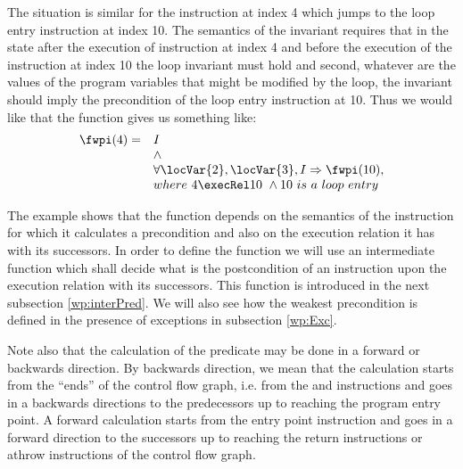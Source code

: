 The situation is  similar  for the instruction at index 4 which jumps to the loop entry instruction at index 10. 
The semantics of the invariant requires that  in the state after the execution of instruction at index 4 and before the execution 
of the instruction at index 10 the loop invariant must hold
and second,  whatever are the values
of the program variables that might be modified by the loop, the invariant should imply the precondition of the loop entry instruction at 10.
 Thus we would like that  the function \fwpi{} gives us something like: 
   $$\begin{array}{ll} \fwpi( 4 ) =& 
                    I \\
		    &\wedge \\
		    &\forall \locVar{2}, \locVar{3},  I  \Rightarrow \fwpi(10), \\
			&    where \ 4 \execRel 10 \ \wedge 10 \ is \ a \ loop \ entry   
      \end{array}
                 $$

The example shows that the function \fwpi{} depends  on the semantics of the instruction 
for which it calculates a precondition and also on the execution relation it has with its successors.
In order to define the function \fwpi{} we will use an intermediate function which shall decide 
what is the postcondition of an instruction  upon the execution relation with its successors. This function 
is introduced in the next subsection \ref{wp:interPred}. We will also see how the weakest precondition is defined in the presence of exceptions in subsection \ref{wp:Exc}.

Note also that the calculation of the \wpName{} predicate may be done in a forward or backwards direction. By backwards direction, we mean that the calculation starts from 
the ``ends'' of the control flow graph, i.e. from the \return{}  and \athrow{}  instructions and goes in a backwards directions to the predecessors up to reaching the program 
entry point. A forward calculation starts from the entry point instruction and goes in a forward direction to the successors up to reaching the return instructions or athrow instructions 
of the control flow  graph.


